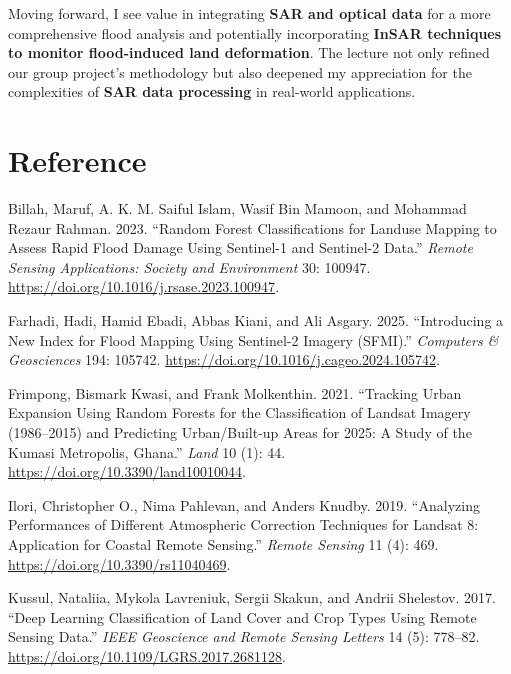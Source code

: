 \documentclass[
  letterpaper,
]{scrbook}
\newlength{\cslhangindent}
\newenvironment{CSLReferences}[2] %
 {\begin{list}{}{%
  \setlength{\itemindent}{0pt}
  \setlength{\leftmargin}{0pt}
  \setlength{\parsep}{0pt}
  \ifodd #1
   \setlength{\leftmargin}{\cslhangindent}
   \setlength{\itemindent}{-1\cslhangindent}
  \fi
  \setlength{\itemsep}{#2\baselineskip}}}
 {\end{list}}
\begin{document}
Moving forward, I see value in integrating \textbf{SAR and optical data}
for a more comprehensive flood analysis and potentially incorporating
\textbf{InSAR techniques to monitor flood-induced land deformation}. The
lecture not only refined our group project's methodology but also
deepened my appreciation for the complexities of \textbf{SAR data
processing} in real-world applications.

\section*{Reference}\label{reference-5}

\label{refs}
\begin{CSLReferences}{1}{0}
Billah, Maruf, A. K. M. Saiful Islam, Wasif Bin Mamoon, and Mohammad
Rezaur Rahman. 2023. {``Random Forest Classifications for Landuse
Mapping to Assess Rapid Flood Damage Using {Sentinel-1} and {Sentinel-2}
Data.''} \emph{Remote Sensing Applications: Society and Environment} 30:
100947. \url{https://doi.org/10.1016/j.rsase.2023.100947}.

Farhadi, Hadi, Hamid Ebadi, Abbas Kiani, and Ali Asgary. 2025.
{``Introducing a New Index for Flood Mapping Using {Sentinel-2} Imagery
({SFMI}).''} \emph{Computers \& Geosciences} 194: 105742.
\url{https://doi.org/10.1016/j.cageo.2024.105742}.

Frimpong, Bismark Kwasi, and Frank Molkenthin. 2021. {``Tracking Urban
Expansion Using Random Forests for the Classification of Landsat Imagery
(1986--2015) and Predicting Urban/Built-up Areas for 2025: A Study of
the Kumasi Metropolis, Ghana.''} \emph{Land} 10 (1): 44.
\url{https://doi.org/10.3390/land10010044}.

Ilori, Christopher O., Nima Pahlevan, and Anders Knudby. 2019.
{``Analyzing Performances of Different Atmospheric Correction Techniques
for {Landsat} 8: Application for Coastal Remote Sensing.''} \emph{Remote
Sensing} 11 (4): 469. \url{https://doi.org/10.3390/rs11040469}.

Kussul, Nataliia, Mykola Lavreniuk, Sergii Skakun, and Andrii Shelestov.
2017. {``Deep Learning Classification of Land Cover and Crop Types Using
Remote Sensing Data.''} \emph{IEEE Geoscience and Remote Sensing
Letters} 14 (5): 778--82.
\url{https://doi.org/10.1109/LGRS.2017.2681128}.


\end{CSLReferences}
\end{document}
